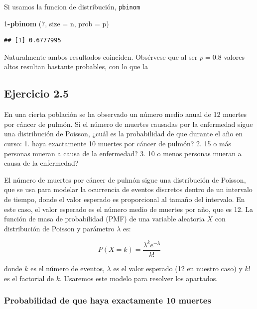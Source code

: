 \documentclass[
]{article}
\newenvironment{Shaded}{\begin{snugshade}}{\end{snugshade}}
\newcommand{\AttributeTok}[1]{\textcolor[rgb]{0.13,0.29,0.53}{#1}}
\newcommand{\DecValTok}[1]{\textcolor[rgb]{0.00,0.00,0.81}{#1}}
\newcommand{\FunctionTok}[1]{\textcolor[rgb]{0.13,0.29,0.53}{\textbf{#1}}}
\newcommand{\NormalTok}[1]{#1}
\newcommand{\SpecialCharTok}[1]{\textcolor[rgb]{0.81,0.36,0.00}{\textbf{#1}}}
\begin{document}
Si usamos la funcion de distribución, \texttt{pbinom}

\begin{Shaded}
\begin{Highlighting}[]
\DecValTok{1}\SpecialCharTok{{-}}\FunctionTok{pbinom}\NormalTok{ (}\DecValTok{7}\NormalTok{, }\AttributeTok{size =}\NormalTok{ n, }\AttributeTok{prob =}\NormalTok{ p)}
\end{Highlighting}
\end{Shaded}

\begin{verbatim}
## [1] 0.6777995
\end{verbatim}

Naturalmente ambos resultados coinciden. Obsérvese que al ser \(p=0.8\) valores altos resultan bastante probables, con lo que la

\subsection{Ejercicio 2.5}\label{ejercicio-2.5}

En una cierta población se ha observado un número medio anual de 12 muertes por cáncer de pulmón. Si el número de muertes causadas por la enfermedad sigue una distribución de Poisson, ¿cuál es la probabilidad de que durante el año en curso:
1. haya exactamente 10 muertes por cáncer de pulmón?
2. 15 o más personas mueran a causa de la enfermedad?
3. 10 o menos personas mueran a causa de la enfermedad?

El número de muertes por cáncer de pulmón sigue una distribución de Poisson, que se usa para modelar la ocurrencia de eventos discretos dentro de un intervalo de tiempo, donde el valor esperado es proporcional al tamaño del intervalo. En este caso, el valor esperado es el número medio de muertes por año, que es 12. La función de masa de probabilidad (PMF) de una variable aleatoria \(X\) con distribución de Poisson y parámetro \(\lambda\) es:

\[ P(X = k) = \frac{\lambda^k e^{-\lambda}}{k!} \]

donde \(k\) es el número de eventos, \(\lambda\) es el valor esperado (12 en nuestro caso) y \(k!\) es el factorial de \(k\). Usaremos este modelo para resolver los apartados.

\subsubsection{Probabilidad de que haya exactamente 10 muertes}\label{probabilidad-de-que-haya-exactamente-10-muertes}
\end{document}
